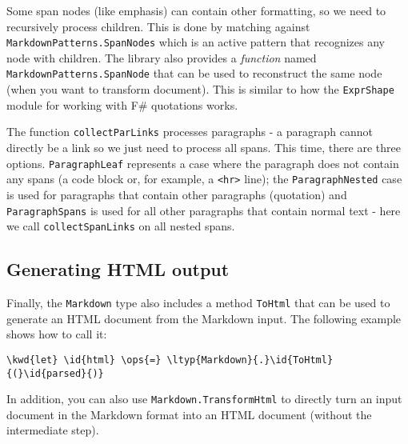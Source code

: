 \documentclass{article}
\newcommand{\id}[1]{\textcolor{black}{#1}}
\newcommand{\kwd}[1]{\textcolor{navy}{#1}}
\newcommand{\ops}[1]{\textcolor{purple}{#1}}
\begin{document}
Some span nodes (like emphasis) can contain other formatting, so we need to recursively
process children. This is done by matching against \texttt{MarkdownPatterns.SpanNodes} which is an active
pattern that recognizes any node with children. The library also provides a \emph{function}
named \texttt{MarkdownPatterns.SpanNode} that can be used to reconstruct the same node (when you want
to transform document). This is similar to how the \texttt{ExprShape} module for working with
F\# quotations works.


The function \texttt{collectParLinks} processes paragraphs - a paragraph cannot directly be a
link so we just need to process all spans. This time, there are three options.
\texttt{ParagraphLeaf} represents a case where the paragraph does not contain any spans
(a code block or, for example, a \texttt{<hr>} line); the \texttt{ParagraphNested} case is used for paragraphs
that contain other paragraphs (quotation) and \texttt{ParagraphSpans} is used for all other
paragraphs that contain normal text - here we call \texttt{collectSpanLinks} on all nested spans.
\subsection*{Generating HTML output}



Finally, the \texttt{Markdown} type also includes a method \texttt{ToHtml} that can be used
to generate an HTML document from the Markdown input. The following example shows how to call it:
\begin{Verbatim}[commandchars=\\\{\}]
\kwd{let} \id{html} \ops{=} \ltyp{Markdown}{.}\id{ToHtml}{(}\id{parsed}{)}
\end{Verbatim}



In addition, you can also use \texttt{Markdown.TransformHtml} to directly turn an input document
in the Markdown format into an HTML document (without the intermediate step).
\end{document}
